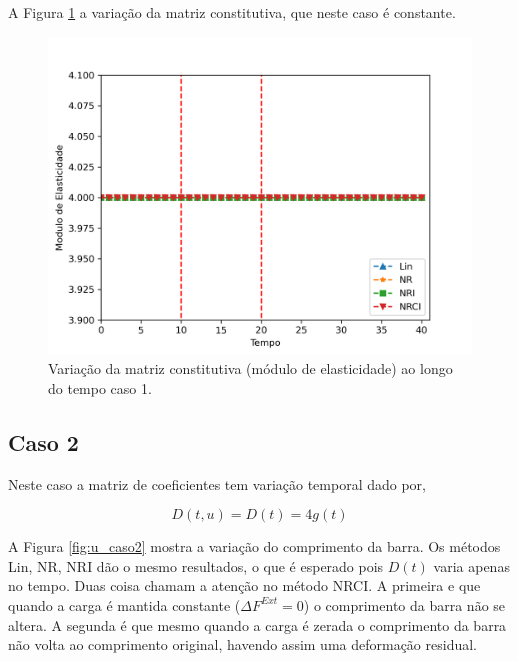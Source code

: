 \documentclass[12pt,a4paper]{article}
\begin{document}
A Figura \ref{fig:modE_caso1} a variação da matriz constitutiva, que neste caso é constante.

\begin{figure}[H]
	\centering
	\includegraphics[width=1.0\textwidth]{caso1/modE_caso1.png}
	\caption{Variação da matriz constitutiva (módulo de elasticidade) ao longo do tempo caso 1.}
	\label{fig:modE_caso1}
\end{figure}

\subsection{Caso 2}

Neste caso a matriz de coeficientes tem variação temporal dado por,

\begin{equation}
D(t,u) = D(t) = 4g(t)
\end{equation}

A Figura \ref{fig:u_caso2} mostra a variação do comprimento da barra. Os métodos Lin, NR, NRI dão o mesmo resultados, o que é esperado pois $D(t)$ varia apenas no tempo. Duas coisa chamam a atenção no método NRCI. A primeira e que quando a carga é mantida constante ($\Delta F^{Ext} = 0$) o comprimento da barra não se altera. A segunda é que mesmo quando a carga é zerada o comprimento da barra não volta ao comprimento original, havendo assim uma deformação residual.
\end{document}
